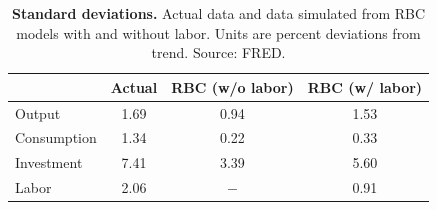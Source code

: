 \begin{table}[h] \caption{\label{tab014_intro_prescott_rbc_stds} \textbf{Standard deviations.} Actual data and data simulated from RBC models with and without labor. Units are percent deviations from trend. {\tiny Source: FRED}.}
\begin{center}\hspace*{-.5cm}

\begin{tabular}{lccc}
\toprule
{} &  Actual & RBC (w/o labor) &  RBC (w/ labor) \\
\midrule
Output      &    1.69 &            0.94 &            1.53 \\
Consumption &    1.34 &            0.22 &            0.33 \\
Investment  &    7.41 &            3.39 &            5.60 \\
Labor       &    2.06 &             $-$ &            0.91 \\
\bottomrule
\end{tabular}
\end{center}
\end{table}